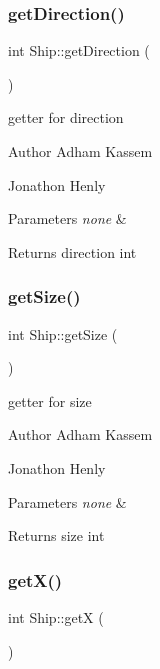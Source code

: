\subsubsection{\texorpdfstring{get\+Direction()}{getDirection()}}
{\footnotesize\ttfamily int Ship\+::get\+Direction (\begin{DoxyParamCaption}{ }\end{DoxyParamCaption})\hspace{0.3cm}{\ttfamily [inline]}}

getter for direction \begin{DoxyAuthor}{Author}
Adham Kassem 

Jonathon Henly 
\end{DoxyAuthor}

\begin{DoxyParams}{Parameters}
{\em none} & \\
\hline
\end{DoxyParams}
\begin{DoxyReturn}{Returns}
direction int 
\end{DoxyReturn}
\mbox{\label{classShip_aa741cc8f584a3fef5450d22cbde8a5f4}} 
\subsubsection{\texorpdfstring{get\+Size()}{getSize()}}
{\footnotesize\ttfamily int Ship\+::get\+Size (\begin{DoxyParamCaption}{ }\end{DoxyParamCaption})\hspace{0.3cm}{\ttfamily [inline]}}

getter for size \begin{DoxyAuthor}{Author}
Adham Kassem 

Jonathon Henly 
\end{DoxyAuthor}

\begin{DoxyParams}{Parameters}
{\em none} & \\
\hline
\end{DoxyParams}
\begin{DoxyReturn}{Returns}
size int 
\end{DoxyReturn}
\mbox{\label{classShip_a846040dad9c03dec8d6bdfc24753f05b}} 
\subsubsection{\texorpdfstring{get\+X()}{getX()}}
{\footnotesize\ttfamily int Ship\+::getX (\begin{DoxyParamCaption}{ }\end{DoxyParamCaption})\hspace{0.3cm}{\ttfamily [inline]}}

